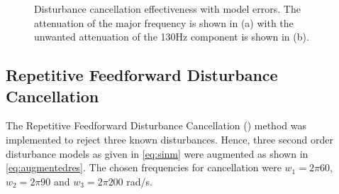 \begin{figure}[h!]
  \centering %
  \qquad
  \caption{\label{fig:imp_model_error}  Disturbance cancellation effectiveness with model errors. The attenuation of the major frequency is shown in (a) with the unwanted attenuation of the 130Hz component is shown in (b).}
\end{figure}

\newpage
\FloatBarrier
\subsection{Repetitive Feedforward Disturbance Cancellation}
The Repetitive Feedforward Disturbance Cancellation (\abbrRFDC) method was implemented to reject three known disturbances. Hence, three second order disturbance models as given in \eqref{eq:sinm} were augmented as shown in \eqref{eq:augmentedres}. The chosen frequencies for cancellation were $w_1 = 2\pi60$, $w_2 = 2\pi90$ and $w_3 = 2\pi200$ rad/s.

